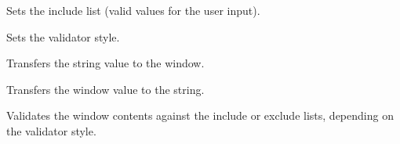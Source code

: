 Sets the include list (valid values for the user input).

\label{wxtextvalidatorsetstyle}


Sets the validator style.

\label{wxtextvalidatortransferfromwindow}


Transfers the string value to the window.

\label{wxtextvalidatortransfertowindow}


Transfers the window value to the string.

\label{wxtextvalidatorvalidate}


Validates the window contents against the include or exclude lists, depending
on the validator style.

